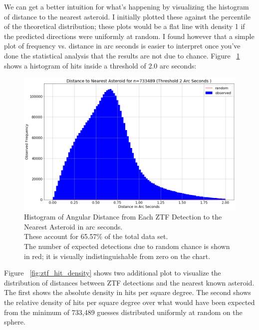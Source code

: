 We can get a better intuition for what's happening by visualizing the histogram of distance to the nearest asteroid.
I initially plotted these against the percentile of the theoretical distribution; 
these plots would be a flat line with density 1 if the predicted directions were uniformly at random.
I found however that a simple plot of frequency vs. distance in arc seconds is easier to interpret 
once you've done the statistical analysis that the results are not due to chance.
Figure ~\ref{fig:hist_ztf_near_ast_dist} shows a histogram of hits inside a threshold of 2.0 arc seconds:
\begin{figure}[hbt!]
\begin{center}
\includegraphics[width=1.0\textwidth]{../figs/ztf/nearest_ast_hist_dist.png}
\end{center}
\caption[Histogram of Angular Distance from Each ZTF Detection to the Nearest Asteroid]
{Histogram of Angular Distance from Each ZTF Detection to the Nearest Asteroid in arc seconds.\\
These account for 65.57\% of the total data set.\\
The number of expected detections due to random chance is shown in red; it is visually indistinguishable from zero on the chart.}
\label{fig:hist_ztf_near_ast_dist}
\end{figure}
Figure ~\ref{fig:ztf_hit_density} shows two additional plot to visualize the distribution of distances between ZTF detections and the nearest known asteroid.
The first shows the absolute density in hits per square degree.
The second shows the relative density of hits per square degree over what would have been expected
from the minimum of 733,489 guesses distributed uniformly at random on the sphere. \\
